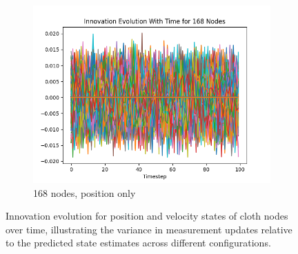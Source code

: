 \documentclass[subscriptcorrection,upint,varvw,barcolor=Goldenrod3,mathalfa=cal=euler,balance,hyphenate,french,pdf-a, nofoot]{asmejour} %
\begin{document}
\begin{figure}[ht]
    \hfill %
    \begin{subfigure}[b]{0.32\linewidth}
        \includegraphics[width=\linewidth]{CLOTH REPORT PICS/innovation 168.jpg}
        \caption{168 nodes, position only}
        \label{fig:innovation-168}
    \end{subfigure}
    \caption{Innovation evolution for position and velocity states of cloth nodes over time, illustrating the variance in measurement updates relative to the predicted state estimates across different configurations.}
    \label{fig:innovations}
\end{figure}
\end{document}

